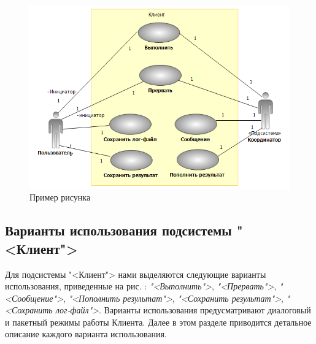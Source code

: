 \documentclass[11pt,oneside]{article}
\begin{document}
\begin{figure}[!ht]
\begin{center}
\includegraphics[scale=0.5]{images/clientUCDiagram.png}\caption{Пример рисунка}\label{figure1}
\end{center}
\end{figure}


\subsection{Варианты использования подсистемы "<Клиент">}\label{S_ClientUseCase}


Для подсистемы "<Клиент"> нами выделяются следующие варианты использования, приведенные на рис. %
: \textit{"<Выполнить">}, \textit{"<Прервать">}, \textit{"<Сообщение">}, \textit{"<Пополнить результат">}, \textit{"<Сохранить результат">}, \textit{"<Сохранить лог-файл">}. Варианты использования предусматривают диалоговый и пакетный режимы работы Клиента. Далее в этом разделе приводится детальное описание каждого варианта использования.
\end{document}
